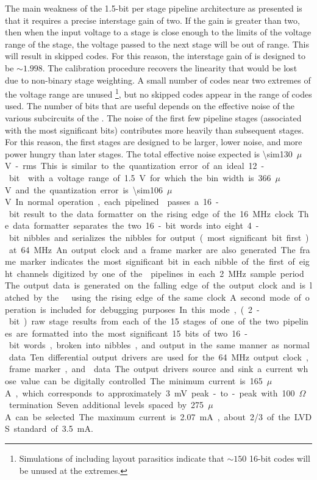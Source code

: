 The main weakness of the 1.5-bit per stage pipeline architecture as presented
is that it requires a precise interstage gain of two.  If the gain is greater
than two, then when the input voltage to a stage is close enough to the limits
of the voltage range of the stage, the voltage passed to the next stage will be
out of range.  This will result in skipped  codes.  For this reason,
the interstage gain of  is designed to be $\sim1.998$.  The
calibration procedure recovers the linearity that would be lost due to
non-binary stage weighting.  A small number of  codes near two
extremes of the voltage range are unused \footnote{Simulations of 
  including layout parasitics indicate that $\sim150$ 16-bit codes will be
  unused at the extremes.}, but no skipped codes appear in the range of codes
used.  The number of  bits that are useful depends on the effective
noise of the various subcircuits of the .  The noise of the first few
pipeline stages (associated with the most significant bits) contributes more
heavily than subsequent stages.  For this reason, the first stages are designed
to be larger, lower noise, and more power hungry than later stages.  The total
effective noise expected is \SI{\sim130}{$\mu$V}-rms.  This is similar to the
quantization error of an ideal 12-bit  with a voltage range of
\SI{1.5}{V} for which the bin width is \SI{366}{$\mu$V} and the quantization
error is \SI{\sim106}{$\mu$V}.

In normal operation, each pipelined  passes a 16-bit result to the
data formatter on the rising edge of the \SI{16}{MHz} clock.  The data formatter
separates the two 16-bit words into eight 4-bit nibbles and serializes the
nibbles for output (most significant bit first) at \SI{64}{MHz}.  An output
clock and a frame marker are also generated.  The frame marker indicates the most
significant bit in each nibble of the first of eight channels digitized by one
of the  pipelines in each \SI{2}{MHz} sample period.  The output data
is generated on the falling edge of the output clock and is latched by the
  using the rising edge of the same clock.  A second
mode of operation is included for debugging purposes.  In this mode, (2-bit) raw
stage results from each of the 15 stages of one of the two pipelines are formatted
into the most significant 15 bits of two 16-bit words, broken into nibbles, and
output in the same manner as normal data.

Ten differential output drivers are used for the \SI{64}{MHz} output clock, frame
marker, and  data.  The output drivers source and sink a current whose
value can be digitally controlled.  The minimum current is \SI{165}{$\mu$A},
which corresponds to approximately \SI{3}{mV} peak-to-peak with \SI{100}{$\Omega$}
termination.  Seven additional levels spaced by \SI{275}{$\mu$A} can be selected.
The maximum current is \SI{2.07}{mA}, about 2/3 of the LVDS standard of
\SI{3.5}{mA}.

